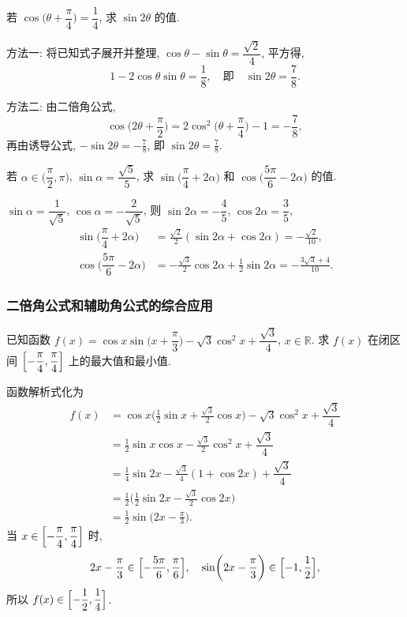 \begin{example}
    若 $\cos\Big(\theta+ \dfrac\pi4\Big)= \dfrac14$, 求 $\sin2\theta$ 的值.
\end{example}
\beginsolution
    方法一: 将已知式子展开并整理, $\cos\theta- \sin\theta= \dfrac{\sqrt2}4$, 平方得,
    \[1-2\cos\theta\sin\theta= \frac18,\quad\text{即}\quad
        \sin2\theta= \frac78.\]
    
    方法二: 由二倍角公式,
    \[\cos\biggl(2\theta+ \frac\pi2\biggr)
        = 2\cos^2\biggl(\theta+ \frac\pi4\biggr)-1
        = -\frac78,\]
    再由诱导公式, $-\sin2\theta= -\frac78$, 即 $\sin2\theta= \frac78$.
\endsolution

\lianxi
\begin{exercise}[s]
    若 $\alpha\in\Big(\dfrac\pi2,\pi\Big)$, $\sin\alpha=\dfrac{\sqrt5}5$, 求 $\sin\Big(\dfrac\pi4+2\alpha\Big)$ 和 
    $\cos\Big(\dfrac{5\pi}6- 2\alpha\Big)$ 的值.
\end{exercise}
\beginsolution
    $\sin\alpha= \dfrac1{\sqrt5}$, $\cos\alpha= -\dfrac2{\sqrt5}$, 则 $\sin2\alpha= -\dfrac45$, $\cos2\alpha= \dfrac35$,
    \[\begin{aligned}
        \sin\Big(\dfrac\pi4+2\alpha\Big)
        &= \frac{\sqrt2}{2}(\sin2\alpha+ \cos2\alpha)
         = -\frac{\sqrt2}{10},\\
        \cos\Big(\dfrac{5\pi}6- 2\alpha\Big)
        &= -\frac{\sqrt3}{2}\cos2\alpha+ \frac12\sin2\alpha
         = -\frac{3\sqrt3+4}{10}.
    \end{aligned}\]
\endsolution

\subsubsection{二倍角公式和辅助角公式的综合应用}
\begin{example}
    已知函数 $f(x)=\cos x\sin\Big(x+\dfrac\pi3\Big)- \sqrt3 \cos^2 x+ \dfrac{\sqrt3}4$, $x\in\mathbb{R}$.
    求 $f(x)$ 在闭区间 $\Bigl[-\dfrac\pi4, \dfrac\pi4\Bigr]$ 上的最大值和最小值.
\end{example}
\beginsolution
    函数解析式化为
    \[\begin{aligned}
        f(x)&= \cos x\biggl(\frac12\sin x+ \frac{\sqrt3}2\cos x\biggr)
            - \sqrt3\cos^2 x+ \dfrac{\sqrt3}4\\
        &= \frac12\sin x\cos x- \frac{\sqrt3}2\cos^2 x+ \dfrac{\sqrt3}4\\
        &= \frac14\sin2x- \frac{\sqrt3}4(1+\cos2x)+ \dfrac{\sqrt3}4\\
        &= \frac12\biggl(\frac12\sin2x- \frac{\sqrt3}{2}\cos2x\biggr)\\
        &= \frac12\sin\biggl(2x-\frac\pi3\biggr).
    \end{aligned}\]
    当 $x\in\Bigl[-\dfrac\pi4, \dfrac\pi4\Bigr]$ 时, 
    \[2x- \dfrac\pi3\in\Bigl[-\dfrac{5\pi}6, \dfrac\pi6\Bigr],
        \quad \sin\biggl(2x- \dfrac\pi3\biggr)\in \Bigl[-1, \dfrac12\Bigr],\]
    所以 $f(x)\in\Bigl[-\dfrac12, \dfrac14\Bigr]$.
\endsolution

